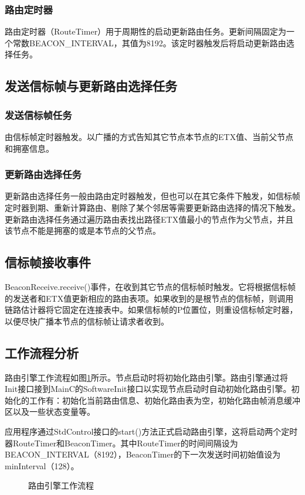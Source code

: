 	\subsubsection{路由定时器}
	路由定时器（RouteTimer）用于周期性的启动更新路由任务。更新间隔固定为一个常数BEACON\_INTERVAL，其值为8192。该定时器触发后将启动更新路由选择任务。

\subsection{发送信标帧与更新路由选择任务}
	\subsubsection{发送信标帧任务}
	由信标帧定时器触发。以广播的方式告知其它节点本节点的ETX值、当前父节点和拥塞信息。
	\subsubsection{更新路由选择任务}
	更新路由选择任务一般由路由定时器触发，但也可以在其它条件下触发，如信标帧定时器到期、重新计算路由、剔除了某个邻居等需要更新路由选择的情况下触发。更新路由选择任务通过遍历路由表找出路径ETX值最小的节点作为父节点，并且该节点不能是拥塞的或是本节点的父节点。

\subsection{信标帧接收事件}
BeaconReceive.receive()事件，在收到其它节点的信标帧时触发。它将根据信标帧的发送者和ETX值更新相应的路由表项。如果收到的是根节点的信标帧，则调用链路估计器将它固定在连接表中。如果信标帧的P位置位，则重设信标帧定时器，以便尽快广播本节点的信标帧让请求者收到。

\subsection{工作流程分析}

路由引擎工作流程如图\ref{route-engine}所示。节点启动时将初始化路由引擎。路由引擎通过将Init接口接到MainC的SoftwareInit接口以实现节点启动时自动初始化路由引擎。初始化的工作有：初始化当前路由信息、初始化路由表为空，初始化路由帧消息缓冲区以及一些状态变量等。

应用程序通过StdControl接口的start()方法正式启动路由引擎，这将启动两个定时器RouteTimer和BeaconTimer。其中RouteTimer的时间间隔设为BEACON\_INTERVAL（8192），BeaconTimer的下一次发送时间初始值设为minInterval（128）。

\begin{figure}[ht]
\centering

\caption{路由引擎工作流程}\label{route-engine}
\end{figure}

